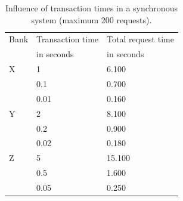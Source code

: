 \documentclass[10pt,a4paper,twocolumn]{article}
\begin{document}
\begin{table}[]
	\begin{tabular}{lll}
		Bank				& Transaction time & Total request time\\
		& in seconds		   & in seconds	\\
		X					 & 1 						  & 6.100 \\
		& 0.1 						& 0.700 \\
		& 0.01 					   & 0.160 \\
		Y				   & 2 							& 8.100 \\
		& 0.2 						&  0.900\\
		& 0.02 					   & 0.180 \\
		Z				   & 5 							& 15.100 \\
		& 0.5 						&  1.600\\
		& 0.05 					   & 0.250
	\end{tabular}
	\caption{\label{tab:banking-time-influence-synchronous}Influence of transaction times in a synchronous system (maximum 200 requests).}
\end{table}
\noindent
\end{document}
